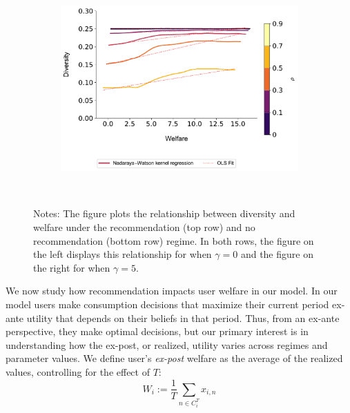 \documentclass[manuscript]{acmart}
\begin{document}
\begin{figure}[ht]
\begin{subfigure}{.3\textwidth}
\end{subfigure}
\begin{subfigure}{.3\textwidth}
\includegraphics[width=1.0\linewidth]{figures/diversity_welfare_ra_partial_n_200.pdf}
\end{subfigure}\\
\caption*{\scriptsize Notes: The figure plots the relationship between diversity and welfare under the recommendation (top row)  and no recommendation (bottom row) regime. In both rows, the figure on the left displays this relationship for when $\gamma = 0$ and the figure on the right for when $\gamma = 5$.}\label{fig:diversity_welfare_ra}
\end{figure}
\addtocounter{figure}{-1}
We now study how recommendation impacts user welfare in our model. In our model users make consumption decisions that maximize their current period ex-ante utility that depends on their beliefs in that period. Thus, from an ex-ante perspective, they make optimal decisions, but our primary interest is in understanding how the ex-post, or realized, utility varies across regimes and parameter values. We define user's \textit{ex-post} welfare as the average of the realized values, controlling for the effect of $T$:
$$W_i:= \frac{1}{T}\sum_{n \in C_i^T} x_{i,n}$$
\end{document}
